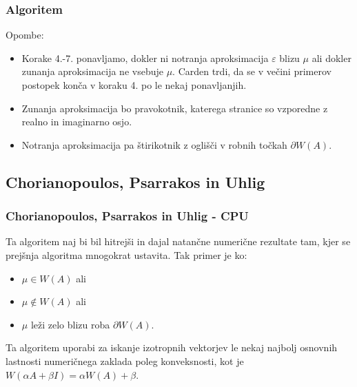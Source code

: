 \documentclass{beamer}
\begin{document}
\begin{frame}
\frametitle{Algoritem}
Opombe: 
\begin{itemize}
\item Korake 4.-7. ponavljamo, dokler ni notranja aproksimacija $\varepsilon$ blizu $\mu$ ali dokler zunanja aproksimacija ne vsebuje $\mu$. Carden trdi, da se v večini primerov postopek konča v koraku 4. po le nekaj ponavljanjih.\\
\item Zunanja aproksimacija bo pravokotnik, katerega stranice so vzporedne z realno in imaginarno osjo.
\item Notranja aproksimacija pa štirikotnik z oglišči v robnih točkah $\partial W(A)$.
\end{itemize}
\end{frame}
\subsection{Chorianopoulos, Psarrakos in Uhlig}
\begin{frame}
\frametitle{Chorianopoulos, Psarrakos in Uhlig - CPU}
Ta algoritem naj bi bil hitrejši in dajal natančne numerične rezultate tam, kjer se prejšnja algoritma mnogokrat ustavita. Tak primer je ko:\medskip
\begin{itemize}
\item $\mu \in W(A)$ ali 
\item $\mu \not\in W(A)$ ali 
\item $\mu$ leži zelo blizu roba $\partial W(A)$. 
\end{itemize}
Ta algoritem uporabi za iskanje izotropnih vektorjev le nekaj najbolj osnovnih lastnosti numeričnega zaklada poleg konveksnosti, kot je $W(\alpha A +\beta I)=\alpha W(A) +\beta$.
\end{frame}
\end{document}
